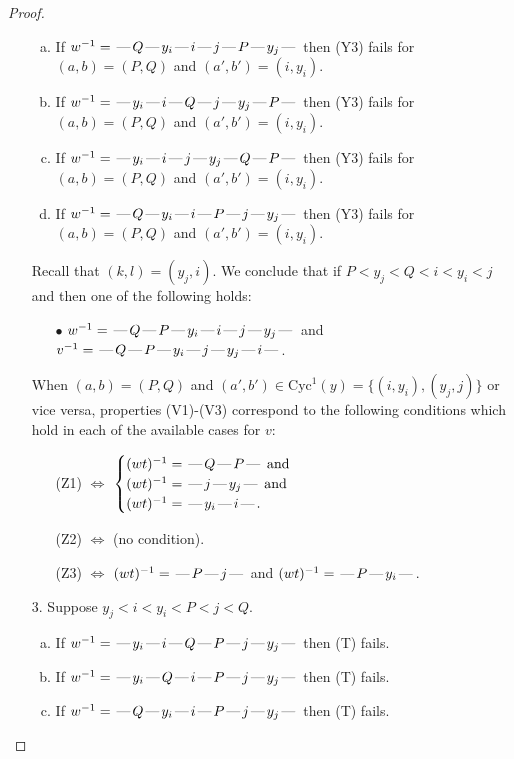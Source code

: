 \documentclass[10pt]{article}
\theoremstyle{definition}
\theoremstyle{definition}
\def\dash{\text{\hspace{0.5mm}---\hspace{0.5mm}}}
\def\Cyc{\mathrm{Cyc}}
\begin{document}
\begin{proof}
\begin{enumerate}
\begin{enumerate}[(a)]
\item If $w^{-1} = \dash Q\dash y_i\dash i\dash j\dash P\dash y_j\dash $ then (Y3) fails for $(a,b)=(P,Q)$ and $(a',b')=(i,y_i)$.
\item If $w^{-1} = \dash y_i\dash i\dash Q\dash j\dash y_j\dash P\dash $ then (Y3) fails for $(a,b)=(P,Q)$ and $(a',b')=(i,y_i)$.
\item If $w^{-1} = \dash y_i\dash i\dash j\dash y_j\dash Q\dash P\dash $ then (Y3) fails for $(a,b)=(P,Q)$ and $(a',b')=(i,y_i)$.
\item If $w^{-1} = \dash Q\dash y_i\dash i\dash P\dash j\dash y_j\dash $ then (Y3) fails for $(a,b)=(P,Q)$ and $(a',b')=(i,y_i)$.
\end{enumerate}
Recall that $(k,l) = (y_j,i)$.
We conclude that if $P < y_j < Q < i < y_i < j$ and then one of the following holds:
\begin{enumerate}
\item[$\bullet$] $w^{-1} = \dash Q\dash P\dash y_i\dash i\dash j\dash y_j\dash $ and $v^{-1} = \dash Q\dash P\dash y_i\dash j\dash y_j\dash i\dash $.
\end{enumerate}
When $(a,b)= (P,Q)$ and $(a',b')\in \Cyc^1(y)=\{(i,y_i),(y_j,j)\}$ or vice versa,
properties (V1)-(V3) correspond to the following conditions which hold in
each of the available cases for $v$:
\begin{enumerate}
\item[](Z1) $\Leftrightarrow$ $\begin{cases}\text{$(wt)^{-1} = \dash Q \dash P \dash$}\text{ and }\\
\text{$(wt)^{-1} = \dash j \dash y_j \dash$}\text{ and }\\
\text{$(wt)^{-1} = \dash y_i \dash i \dash$}.\end{cases}$
\item[](Z2) $\Leftrightarrow$ (no condition).
\item[](Z3) $\Leftrightarrow$ $(wt)^{-1} = \dash P \dash j \dash$  and $(wt)^{-1} = \dash P \dash y_i \dash$.
\end{enumerate}
\item[$3$.] Suppose $y_j < i < y_i < P < j < Q$.
\begin{enumerate}[(a)]
\item If $w^{-1} = \dash y_i\dash i\dash Q\dash P\dash j\dash y_j\dash $ then (T) fails.
\item If $w^{-1} = \dash y_i\dash Q\dash i\dash P\dash j\dash y_j\dash $ then (T) fails.
\item If $w^{-1} = \dash Q\dash y_i\dash i\dash P\dash j\dash y_j\dash $ then (T) fails.

\end{enumerate}
\end{enumerate}
\end{proof}
\end{document}
